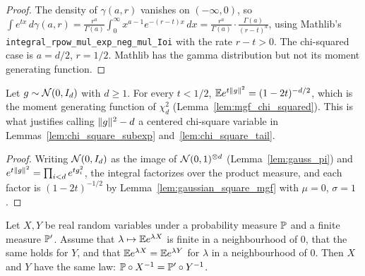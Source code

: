 \begin{proof}
\leanok
The density of $\gamma(a,r)$ vanishes on $(-\infty,0)$, so
$\int e^{tx}\,d\gamma(a,r) = \frac{r^a}{\Gamma(a)}\int_0^\infty x^{a-1}e^{-(r-t)x}\,dx
= \frac{r^a}{\Gamma(a)}\cdot\frac{\Gamma(a)}{(r-t)^a}$, using Mathlib's
\texttt{integral\_rpow\_mul\_exp\_neg\_mul\_Ioi} with the rate $r - t > 0$. The chi-squared case is
$a = d/2$, $r = 1/2$. Mathlib has the gamma distribution but not its moment generating function.
\end{proof}

\begin{lemma}\label{lem:norm_sq_chi_squared}
\leanok
{}
Let $g \sim \mathcal{N}(0,I_d)$ with $d \ge 1$. For every $t < 1/2$,
$\mathbb{E} e^{t\lVert g \rVert^2} = (1-2t)^{-d/2}$, which is the moment generating function of $\chi^2_d$
(Lemma~\ref{lem:mgf_chi_squared}). This is what justifies calling $\lVert g \rVert^2 - d$ a centered
chi-square variable in Lemmas~\ref{lem:chi_square_subexp} and~\ref{lem:chi_square_tail}.
\end{lemma}

\begin{proof}
\leanok
Writing $\mathcal{N}(0,I_d)$ as the image of $\mathcal{N}(0,1)^{\otimes d}$
(Lemma~\ref{lem:gauss_pi}) and $e^{t\lVert g \rVert^2} = \prod_{i<d} e^{tg_i^2}$, the integral factorizes
over the product measure, and each factor is $(1-2t)^{-1/2}$ by
Lemma~\ref{lem:gaussian_square_mgf} with $\mu = 0$, $\sigma = 1$.
\end{proof}

\begin{theorem}\label{thm:ext_of_mgf}
\leanok
Let $X, Y$ be real random variables under a probability measure $\mathbb{P}$ and a finite measure
$\mathbb{P}'$. Assume that $\lambda \mapsto \mathbb{E} e^{\lambda X}$ is finite in a neighbourhood of $0$, that
the same holds for $Y$, and that $\mathbb{E} e^{\lambda X} = \mathbb{E} e^{\lambda Y}$ for $\lambda$ in a
neighbourhood of $0$. Then $X$ and $Y$ have the same law: $\mathbb{P}\circ X^{-1} = \mathbb{P}'\circ Y^{-1}$.
\end{theorem}

